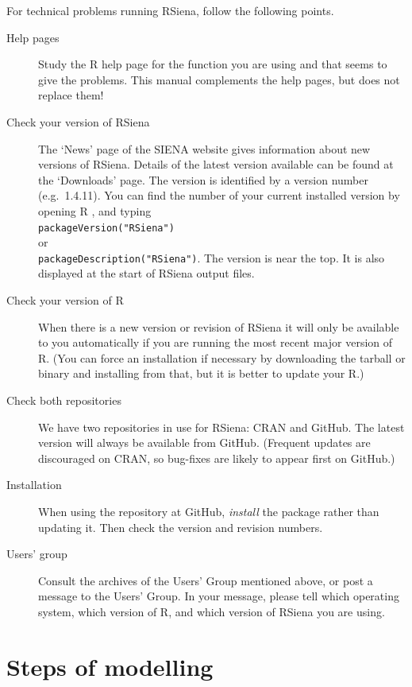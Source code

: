 \documentclass[a4paper,fleqn,11pt]{article}
\newcommand{\+}{\, + \,}
\newcommand{\R}{{\sf R }}
\newcommand{\Rn}{{\sf R}}
\newcommand{\rs}{{\sf RSiena}}
\newcommand{\RS}{{\sf \textsf{RSiena} }}
\newcommand{\SI}{{\sf SIENA }}
\begin{document}
For technical problems running \rs, follow the following points.
\begin{description}
\item[Help pages] Study the \R help page for the function you are using and that seems to give
      the problems. This manual complements the help pages,
      but does not replace them!
\item[Check your version of \RS]
  The `News' page of the \SI website gives information about new versions
  of \rs. Details of the latest version available can
  be found at the `Downloads' page.
  The version is
  identified by a version number (e.g.\ 1.4.11).
  You can find the number of your current installed version by
  opening \R, and typing\\
  \verb|packageVersion("RSiena")|   \\
  or \\
  \verb|packageDescription("RSiena")|. The version is
  near the top. It is also displayed at the
  start of \RS output files.
\item[Check your version of \Rn] When there is a new version or revision of \RS
  it will only be available to you automatically if you are running the most
  recent major version of \Rn. (You can force an installation if
  necessary by downloading the tarball or binary and installing from that, but
  it is better to update your \Rn.)
\item [Check both repositories] We have two repositories in use for \rs: CRAN
  and GitHub. The latest version will always be available from
  GitHub. (Frequent updates are discouraged on CRAN, so bug-fixes are likely to
  appear first on GitHub.)
\item[Installation] When using the repository at GitHub, \emph{install} the
  package rather than updating it. Then check the version and revision numbers.
\item[Users' group] Consult the archives of the Users' Group mentioned above, or post
     a message to the Users' Group. In your message,
     please tell which operating system, which version of \Rn, and which version
     of \RS you are using.
\end{description}

\newpage

\section{Steps of modelling}
\label{S_parts}
\end{document}

